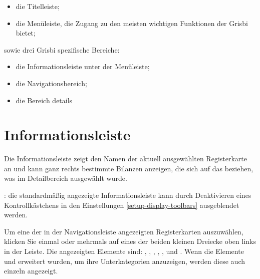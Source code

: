 \begin{itemize}%
	\item[\large\textcircled{\small 1}] die Titelleiste;%
	\item[\large\textcircled{\small 2}] die Menüleiste, die Zugang zu den meisten wichtigen Funktionen der Grisbi bietet;%
\end{itemize}
sowie drei Grisbi spezifische Bereiche:%
\begin{itemize}%
	\item[\large\textcircled{\small 3}] die Informationsleiste unter der Menüleiste;%
	\item[\large\textcircled{\small 4}] die Navigationsbereich;%
	\item[\large\textcircled{\small 5}] die Bereich details%
\end{itemize}

\section{Informationsleiste\label{home-synthesis}}

Die Informationsleiste zeigt den Namen der aktuell ausgewählten Registerkarte an und kann ganz rechts bestimmte Bilanzen anzeigen, die sich auf das beziehen, was im Detailbereich ausgewählt wurde.%


\Note{}: die standardmäßig angezeigte Informationsleiste kann durch Deaktivieren eines Kontrollkästchens in den Einstellungen \vref{setup-display-toolbars} ausgeblendet werden.%

Um eine der in der Navigationsleiste angezeigten Registerkarten auszuwählen, klicken Sie einmal oder mehrmals auf eines der beiden kleinen Dreiecke oben links in der Leiste.  Die angezeigten Elemente sind: , , , , ,  und .  Wenn die Elemente  und  erweitert wurden, um ihre Unterkategorien anzuzeigen, werden diese auch einzeln angezeigt.%

